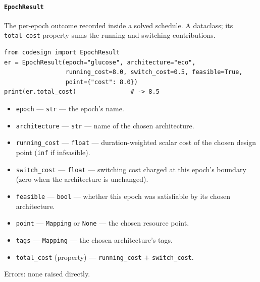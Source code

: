 \documentclass[11pt,a4paper]{article}
\begin{document}
\paragraph{\texttt{EpochResult}}\label{ref:temporal:epochresult}
The per-epoch outcome recorded inside a solved schedule. A dataclass; its
\texttt{total\_cost} property sums the running and switching contributions.
\begin{lstlisting}
from codesign import EpochResult
er = EpochResult(epoch="glucose", architecture="eco",
                 running_cost=8.0, switch_cost=0.5, feasible=True,
                 point={"cost": 8.0})
print(er.total_cost)               # -> 8.5
\end{lstlisting}
\begin{itemize}[nosep]
  \item \texttt{epoch} --- \texttt{str} --- the epoch's name.
  \item \texttt{architecture} --- \texttt{str} --- name of the chosen
    architecture.
  \item \texttt{running\_cost} --- \texttt{float} --- duration-weighted
    scalar cost of the chosen design point (\texttt{inf} if infeasible).
  \item \texttt{switch\_cost} --- \texttt{float} --- switching cost charged
    at this epoch's boundary (zero when the architecture is unchanged).
  \item \texttt{feasible} --- \texttt{bool} --- whether this epoch was
    satisfiable by its chosen architecture.
  \item \texttt{point} --- \texttt{Mapping} or \texttt{None} --- the chosen
    resource point.
  \item \texttt{tags} --- \texttt{Mapping} --- the chosen architecture's
    tags.
  \item \texttt{total\_cost} (property) --- \texttt{running\_cost} $+$
    \texttt{switch\_cost}.
\end{itemize}
Errors: none raised directly.
\end{document}
